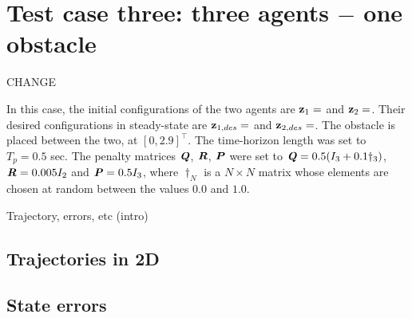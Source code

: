 \section{Test case three: three agents $-$ one obstacle}

CHANGE

In this case, the initial configurations of the two agents are
$\bm{\mathbf{z}}_1 = $ and
$\bm{\mathbf{z}}_2 = $.
Their desired configurations in steady-state are
$\bm{\mathbf{z}}_{1,des} = $ and
$\bm{\mathbf{z}}_{2,des} = $.
The obstacle is placed between the two, at $[0, 2.9]^{\top}$. The time-horizon
length was set to $T_p = 0.5$ sec. The penalty matrices $\bm{\mathit{Q}}$, $\bm{\mathit{R}}$,
$\bm{\mathit{P}}$ were set to $\bm{\mathit{Q}} = 0.5 (I_3 + 0.1 \dagger_3)$,
$\bm{\mathit{R}} = 0.005 I_2$ and $\bm{\mathit{P}} = 0.5 I_3$, where $\dagger_N$ is a
$N \times N$ matrix whose elements are chosen at random between the values $0.0$
and $1.0$.

Trajectory, errors, etc (intro)


\subsection{Trajectories in 2D}

\begin{figure}[H]
  
  \caption{}
  \label{}
\end{figure}


\subsection{State errors}

\begin{figure}[H]
  \scalebox{0.7}{}
  \caption{}
  \label{}
\end{figure}

\noindent{}


